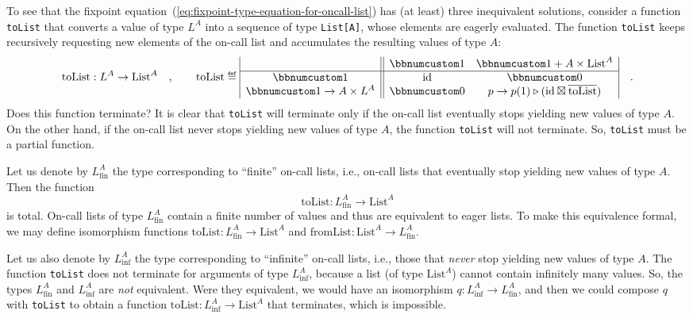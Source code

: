 To see that the fixpoint equation~(\ref{eq:fixpoint-type-equation-for-oncall-list})
has (at least) three inequivalent solutions, consider a function \lstinline!toList!
that converts a value of type $L^{A}$ into a sequence of type \lstinline!List[A]!,
whose elements are eagerly evaluated. The function \lstinline!toList!
keeps recursively requesting new elements of the on-call list and
accumulates the resulting values of type $A$:
\[
\text{toList}:L^{A}\rightarrow\text{List}^{A}\quad,\quad\quad\text{toList}\triangleq\begin{array}{|c||cc|}
 & \bbnum 1 & \bbnum 1+A\times\text{List}^{A}\\
\hline \bbnum 1 & \text{id} & \bbnum 0\\
\bbnum 1\rightarrow A\times L^{A} & \bbnum 0 & p\rightarrow p(1)\triangleright(\text{id}\boxtimes\overline{\text{toList}})
\end{array}\quad.
\]
Does this function terminate? It is clear that \lstinline!toList!
will terminate only if the on-call list eventually stops yielding
new values of type $A$. On the other hand, if the on-call list never
stops yielding new values of type $A$, the function \lstinline!toList!
will not terminate. So, \lstinline!toList!
must be a partial function. 

Let us denote by $L_{\text{fin}}^{A}$ the type corresponding to \textsf{``}finite\textsf{''}
on-call lists, i.e., on-call lists that eventually stop yielding new
values of type $A$. Then the function
\[
\text{toList}:L_{\text{fin}}^{A}\rightarrow\text{List}^{A}
\]
is total. On-call lists of type $L_{\text{fin}}^{A}$ contain a finite
number of values and thus are equivalent to eager lists. To make this
equivalence formal, we may define isomorphism functions $\text{toList}:L_{\text{fin}}^{A}\rightarrow\text{List}^{A}$
and $\text{fromList}:\text{List}^{A}\rightarrow L_{\text{fin}}^{A}$. 

Let us also denote by $L_{\text{inf}}^{A}$ the type corresponding
to \textsf{``}infinite\textsf{''} on-call lists, i.e., those that \emph{never} stop
yielding new values of type $A$. The function \lstinline!toList!
does not terminate for arguments of type $L_{\text{inf}}^{A}$, because
a list (of type $\text{List}^{A}$) cannot contain infinitely many
values. So, the types $L_{\text{fin}}^{A}$ and $L_{\text{inf}}^{A}$
are \emph{not} equivalent. Were they equivalent, we would have an
isomorphism $q:L_{\text{inf}}^{A}\rightarrow L_{\text{fin}}^{A}$,
and then we could compose $q$ with \lstinline!toList!
to obtain a function $\text{toList}:L_{\text{inf}}^{A}\rightarrow\text{List}^{A}$
that terminates, which is impossible.

